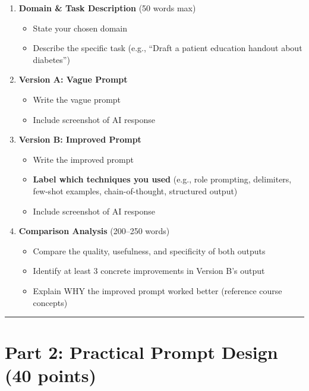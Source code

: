 \documentclass[11pt]{article}
\begin{document}
\begin{enumerate}[label=\alph*.]
    \item \textbf{Domain \& Task Description} (50 words max)
    \begin{itemize}
        \item State your chosen domain
        \item Describe the specific task (e.g., ``Draft a patient education handout about diabetes'')
    \end{itemize}
    
    \item \textbf{Version A: Vague Prompt}
    \begin{itemize}
        \item Write the vague prompt
        \item Include screenshot of AI response
    \end{itemize}
    
    \item \textbf{Version B: Improved Prompt}
    \begin{itemize}
        \item Write the improved prompt
        \item \textbf{Label which techniques you used} (e.g., role prompting, delimiters, few-shot examples, chain-of-thought, structured output)
        \item Include screenshot of AI response
    \end{itemize}
    
    \item \textbf{Comparison Analysis} (200--250 words)
    \begin{itemize}
        \item Compare the quality, usefulness, and specificity of both outputs
        \item Identify at least 3 concrete improvements in Version B's output
        \item Explain WHY the improved prompt worked better (reference course concepts)
    \end{itemize}
\end{enumerate}

\hrule
\vspace{0.5cm}

\section{Part 2: Practical Prompt Design (40 points)}
\end{document}
